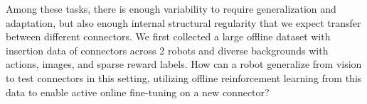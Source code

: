 Among these tasks, there is enough variability to require generalization and adaptation, but also enough internal structural regularity that we expect transfer between different connectors.
We first collected a large offline dataset with insertion data of \numconnectors{} connectors across 2 robots and diverse backgrounds with actions, images, and sparse reward labels.
How can a robot generalize from vision to test connectors in this setting, utilizing offline reinforcement learning from this data to enable active online fine-tuning on a new connector?


